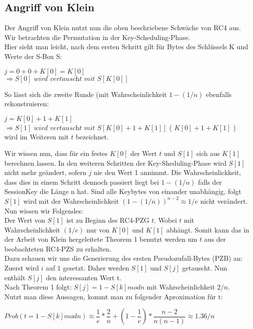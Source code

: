 \documentclass[10pt,a4paper]{article}
\begin{document}
\subsection{Angriff von Klein}\label{ssec:klein}
Der Angriff von Klein nutzt nun die oben beschriebene Schwäche von RC4 aus. Wir betrachten die Permutation in der Key-Scheduling-Phase.\\
Hier sieht man leicht, nach dem ersten Schritt gilt für Bytes des Schlüssels K und Werte der S-Box S:
\begin{center}
$ j = 0+0+K[0] = K[0] $\\
$\Rightarrow S[0] \textit{ wird vertauscht mit }  S[K[0]] $\\
\end{center}
So lässt sich die zweite Runde (mit Wahrscheinlichkeit $1 - (1/n)$ ebenfalls rekonstruieren:
\begin{center}
$ j = K[0] + 1 + K[1]$\\  
$\Rightarrow S[1] \textit{ wird vertauscht mit } S[ K[0] + 1 + K[1] ] $ ( $K[0] + 1 + K[1]$ ) wird im Weiteren mit  $t$ bezeichnet.\\
\end{center}
Wir wissen nun, dass für ein festes $K[0]$ der Wert $t$ und $S[1]$ sich aus $K[1]$ berechnen lassen.
In den weiteren Schritten der Key-Sheduling-Phase wird $S[1]$ nicht mehr geändert, sofern $j$ nie den Wert 1 annimmt.
Die Wahrscheinlickkeit, dass dies in einem Schritt dennoch passiert liegt bei $1 - (1/n)$ falls der SessionKey die Länge n hat.
Sind alle Keybytes von einander unabhängig, folgt $S[1]$ wird mit der Wahrscheinlichkeit $(1-(1/n))^{n-2} \approx 1/e$ nicht verändert.\\
Nun wissen wir Folgendes:\\
Der Wert von $S[1]$ ist zu Beginn des RC4-PZG $t$. Wobei $t$ mit Wahrscheinlichkeit $(1/e)$ nur von $K[0]$ und $K[1]$ abhängt. Somit kann das in der Arbeit von Klein hergeleitete Theorem 1 \cite{Kle08} benutzt werden um $t$ aus der beobachteten RC4-PZS zu erhalten.\\
Dazu schauen wir uns die Generierung des ersten Pseudozufall-Bytes (PZB) an:\\
Zuerst wird $i$ auf $1$ gesetzt. Daher werden $S[1]$ und $S[j]$ getauscht. Nun enthält $S[j]$ den interessanten Wert t.\\
Nach Theorem 1 folgt: $S[j] = 1 - S[k] mod n$ mit Wahrscheinlichkeit $2/n$.\\
Nutzt man diese Aussagen, kommt man zu folgender Aproximation für t:
\begin{center}
$Prob( t = 1 - S[k] mod n) \approx \dfrac{1}{e} * \dfrac{2}{n} + ( 1- \dfrac{1}{e}) * \dfrac{n-2}{n(n-1)} \approx 1.36/n$
\end{center}
\end{document}
